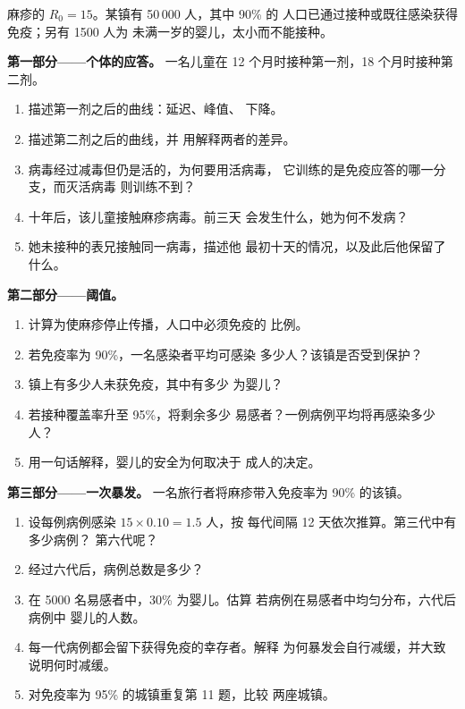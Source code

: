\begin{problem}
\label{pb:g12:adaptive-immunity:1}
麻疹的 $R_0 = 15$。某镇有 50\,000 人，其中 90\% 的
人口已通过接种或既往感染获得免疫；另有 1500 人为
未满一岁的婴儿，太小而不能接种。

\medskip
\noindent\textbf{第一部分——个体的应答。}
一名儿童在 12 个月时接种第一剂，18 个月时接种第二剂。
\begin{enumerate}
  \item 描述第一剂之后的曲线：延迟、峰值、
        下降。
  \item 描述第二剂之后的曲线，并
        用解释两者的差异。
  \item {}病毒经过减毒但仍是活的，为何要用活病毒，
        它训练的是免疫应答的哪一分支，而灭活病毒
        则训练不到？
  \item 十年后，该儿童接触麻疹病毒。前三天
        会发生什么，她为何不发病？
  \item 她未接种的表兄接触同一病毒，描述他
        最初十天的情况，以及此后他保留了什么。
\end{enumerate}

\medskip
\noindent\textbf{第二部分——阈值。}
\begin{enumerate}[resume]
  \item 计算为使麻疹停止传播，人口中必须免疫的
        比例。
  \item 若免疫率为 90\%，一名感染者平均可感染
        多少人？该镇是否受到保护？
  \item 镇上有多少人未获免疫，其中有多少
        为婴儿？
  \item 若接种覆盖率升至 95\%，将剩余多少
        易感者？一例病例平均将再感染多少人？
  \item 用一句话解释，婴儿的安全为何取决于
        成人的决定。
\end{enumerate}

\medskip
\noindent\textbf{第三部分——一次暴发。}
一名旅行者将麻疹带入免疫率为 90\% 的该镇。
\begin{enumerate}[resume]
  \item 设每例病例感染 $15 \times 0.10 = 1.5$ 人，按
        每代间隔 12 天依次推算。第三代中有多少病例？
        第六代呢？
  \item 经过六代后，病例总数是多少？
  \item 在 5000 名易感者中，30\% 为婴儿。估算
        若病例在易感者中均匀分布，六代后病例中
        婴儿的人数。
  \item 每一代病例都会留下获得免疫的幸存者。解释
        为何暴发会自行减缓，并大致说明何时减缓。
  \item 对免疫率为 95\% 的城镇重复第 11 题，比较
        两座城镇。
\end{enumerate}


\end{problem}
